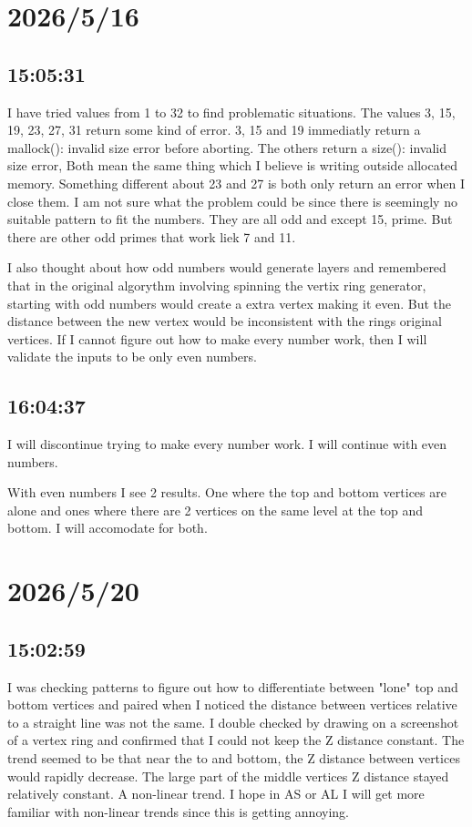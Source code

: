 \documentclass{article}
\begin{document}
\section*{2026/5/16}
\subsection*{15:05:31}
I have tried values from 1 to 32 to find problematic situations. The values 3, 15, 19, 23, 27, 31
return some kind of error. 3, 15 and 19 immediatly return a mallock(): invalid size error before
aborting. The others return a size(): invalid size error, Both mean the same thing which I believe 
is writing outside allocated memory. Something different about 23 and 27 is both only return an error
when I close them. I am not sure what the problem could be since there is seemingly no suitable 
pattern to fit the numbers. They are all odd and except 15, prime. But there are other odd primes that
work liek 7 and 11.

I also thought about how odd numbers would generate layers and remembered that in the original algorythm
involving spinning the vertix ring generator, starting with odd numbers would create a extra vertex 
making it even. But the distance between the new vertex would be inconsistent with the rings original 
vertices. If I cannot figure out how to make every number work, then I will validate the inputs to be
only even numbers.

\subsection*{16:04:37}
I will discontinue trying to make every number work. I will continue with even numbers.

With even numbers I see 2 results. One where the top and bottom vertices are alone and ones where there
are 2 vertices on the same level at the top and bottom. I will accomodate for both.

\section*{2026/5/20}
\subsection*{15:02:59}
I was checking patterns to figure out how to differentiate between "lone" top and bottom vertices and 
paired when I noticed the distance between vertices relative to a straight line was not the same. I 
double checked by drawing on a screenshot of a vertex ring and confirmed that I could not keep the Z
distance constant. The trend seemed to be that near the to and bottom, the Z distance between vertices 
would rapidly decrease. The large part of the middle vertices Z distance stayed relatively constant.
A non-linear trend. I hope in AS or AL I will get more familiar with non-linear trends since this is
getting annoying.
\end{document}
